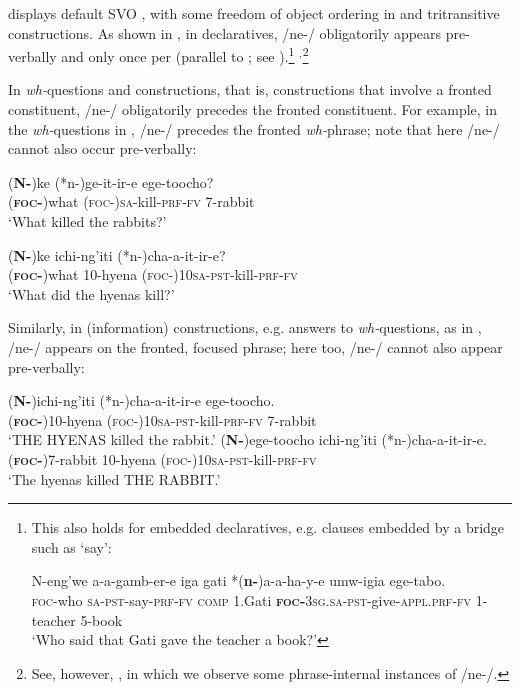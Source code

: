 \documentclass[output=paper,modfonts]{langscibook}
\begin{document}
 displays default SVO , with some freedom of object ordering in  and tritransitive constructions. As shown in , in declaratives, /ne-/ obligatorily appears pre-verbally and only once per  (parallel to ; see \citealt[142]{Schwarz2007}).\footnote{%
  This also holds for embedded declaratives, e.g. clauses embedded by a bridge  such as ‘say’:

  \ea
  \gll N-eng’we a-a-gamb-er-e iga gati *(\textbf{n-})a-a-ha-y-e umw-igia ege-tabo.\\
  \textsc{foc}-who \textsc{sa}-\textsc{pst}-say-\textsc{prf}-\textsc{fv} \textsc{comp} 1.Gati \textsc{\textbf{foc}}\textbf{-}\textsc{3sg}.\textsc{sa}-\textsc{pst}-give-\textsc{appl}.\textsc{prf}-\textsc{fv} 1-teacher 5-book\\
  \glt ‘Who said that Gati gave the teacher a book?’
  \zlast
}%
$^,$\footnote{See, however, , in which we observe some phrase-internal instances of /ne-/.}

\newpage 
In \textit{wh-}questions and  constructions, that is, constructions that involve a fronted constituent, /ne-/ obligatorily precedes the fronted constituent. For example, in the \textit{wh-}questions in , /ne-/ precedes the fronted \textit{wh-}phrase; note that here /ne-/ cannot also occur pre-verbally:

\ea\label{ex:landmann:2}
\ea 
\gll *(\textbf{N-})ke (*n-)ge-it-ir-e ege-toocho?\\
     (\textsc{\textbf{foc}}\textbf{-})what (\textsc{foc}-)\textsc{sa}-kill-\textsc{prf}-\textsc{fv} 7-rabbit\\
\glt ‘What killed the rabbits?’

\ex
\gll  *(\textbf{N-})ke ichi-ng’iti (*n-)cha-a-it-ir-e?\\
     (\textsc{\textbf{foc}}\textbf{-})what 10-hyena (\textsc{foc}-)\textsc{10sa}-\textsc{pst}-kill-\textsc{prf}-\textsc{fv}\\
\glt ‘What did the hyenas kill?’
\z
\z

Similarly, in (information)  constructions, e.g. answers to \textit{wh-}questions, as in , /ne-/ appears on the fronted, focused phrase; here too, /ne-/ cannot also appear pre-verbally:

\ea\label{ex:landmann:3}
\ea 
  \gll   *(\textbf{N-})ichi-ng’iti (*n-)cha-a-it-ir-e ege-toocho.\\
     (\textsc{\textbf{foc}}\textbf{-})10-hyena (\textsc{foc}-)\textsc{10sa}-\textsc{pst}-kill-\textsc{prf}-\textsc{fv} 7-rabbit\\
\glt ‘THE HYENAS killed the rabbit.’
\ex
\gll  *(\textbf{N-})ege-toocho ichi-ng’iti (*n-)cha-a-it-ir-e.\\
     (\textsc{\textbf{foc}}\textbf{-})7-rabbit 10-hyena (\textsc{foc}-)\textsc{10sa}-\textsc{pst}-kill-\textsc{prf}-\textsc{fv}\\
\glt ‘The hyenas killed THE RABBIT.’
\z
\z
\end{document}
